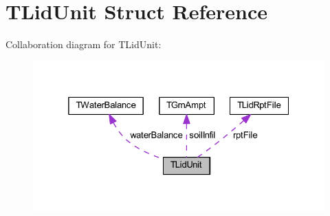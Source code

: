 \hypertarget{struct_t_lid_unit}{}\section{T\+Lid\+Unit Struct Reference}
\label{struct_t_lid_unit}


Collaboration diagram for T\+Lid\+Unit\+:
\nopagebreak
\begin{figure}[H]
\begin{center}
\leavevmode
\includegraphics[width=325pt]{d9/dae/struct_t_lid_unit__coll__graph}
\end{center}
\end{figure}
